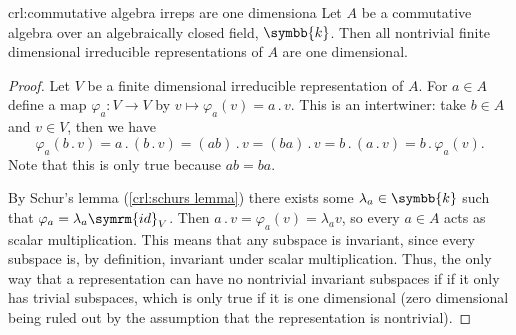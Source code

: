 \documentclass[fleqn]{NotesClass}
\renewcommand{\field}{\symbb{k}}
\newcommand{\id}{\symrm{id}}
\newcommand{\action}{\mathbin{.}}
\begin{document}
    \begin{crl}{}{crl:commutative algebra irreps are one dimensiona}
        Let \(A\) be a commutative algebra over an algebraically closed field, \(\field\).
        Then all nontrivial finite dimensional irreducible representations of \(A\) are one dimensional.
        \begin{proof}
            Let \(V\) be a finite dimensional irreducible representation of \(A\).
            For \(a \in A\) define a map \(\varphi_a \colon V \to V\) by \(v \mapsto \varphi_a(v) = a \action v\).
            This is an intertwiner: take \(b \in A\) and \(v \in V\), then we have
            \begin{equation}
                \varphi_a(b \action v) = a \action (b \action v) = (ab) \action v = (ba) \action v = b \action (a \action v) = b \action \varphi_a(v).
            \end{equation}
            Note that this is only true because \(ab = ba\).
            
            By Schur's lemma (\cref{crl:schurs lemma}) there exists some \(\lambda_a \in \field\) such that \(\varphi_a = \lambda_a \id_V\).
            Then \(a \action v = \varphi_a(v) = \lambda_a v\), so every \(a \in A\) acts as scalar multiplication.
            This means that any subspace is invariant, since every subspace is, by definition, invariant under scalar multiplication.
            Thus, the only way that a representation can have no nontrivial invariant subspaces if if it only has trivial subspaces, which is only true if it is one dimensional (zero dimensional being ruled out by the assumption that the representation is nontrivial).
        \end{proof}
    \end{crl}
    
\end{document}
